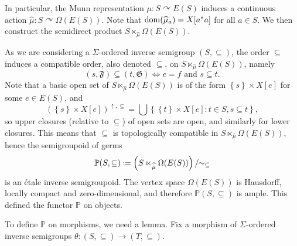 In particular, the Munn representation $\mu\colon S\curvearrowright E(S)$ induces a continuous action $\widehat{\mu}\colon S\curvearrowright \Omega(E(S))$. Note that $\operatorname{dom}(\widehat{\mu}_a)=X[a^*a]$ for all $a\in S$. We then construct the semidirect product $S\ltimes_{\widehat{\mu}}\Omega(E(S))$.

As we are considering a $\Sigma$-ordered inverse semigroup $(S,\subseteq)$, the order $\subseteq$ induces a compatible order, also denoted $\subseteq$, on $S\ltimes_{\widehat{\mu}}\Omega(E(S))$, namely
\[(s,\mathfrak{F})\subseteq(t,\mathfrak{G})\iff e=f\text{ and }s\subseteq t.\]
Note that a basic open set of $S\ltimes_{\widehat{\mu}}\Omega(E(S))$ is of the form $\left\{s\right\}\times X[e]$ for some $e\in E(S)$, and
\[\left(\left\{s\right\}\times X[e]\right)^{\uparrow,\subseteq}=\bigcup\left\{\left\{t\right\}\times X[e]:t\in S,s\subseteq t\right\},\]
so upper closures (relative to $\subseteq$) of open sets are open, and similarly for lower closures. This means that $\subseteq$ is topologically compatible in $S\ltimes_{\widehat{\mu}}\Omega(E(S))$, hence the semigroupoid of germs
\[\mathbb{P}(S,\subseteq)\defeq \left(S\ltimes_{\widehat{\mu}}\Omega(E(S))\right)/\!\!\sim_{\subseteq}\]
is an étale inverse semigroupoid. The vertex space $\Omega(E(S))$ is Hausdorff, locally compact and zero-dimensional, and therefore $\mathbb{P}(S,\subseteq)$ is ample. This defined the functor $\mathbb{P}$ on objects.

To define $\mathbb{P}$ on morphisms, we need a lemma. Fix a morphism  of $\Sigma$-ordered inverse semigroups $\theta\colon(S,\subseteq)\to(T,\subseteq)$.

